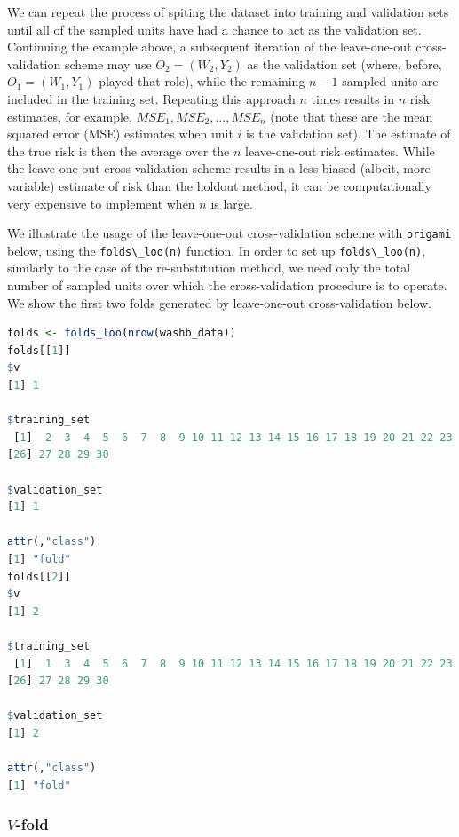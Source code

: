 \documentclass[
  12pt, krantz2,
]{krantz}
\newcommand{\passthrough}[1]{#1}
\newcommand{\1}{\mathbbm{1}}
\theoremstyle{definition}
\theoremstyle{definition}
\theoremstyle{definition}
\theoremstyle{definition}
\theoremstyle{remark}
\begin{document}
We can repeat the process of spiting the dataset into training and validation
sets until all of the sampled units have had a chance to act as the validation
set. Continuing the example above, a subsequent iteration of the leave-one-out
cross-validation scheme may use \(O_2 = (W_2, Y_2)\) as the validation set (where,
before, \(O_1 = (W_1, Y_1)\) played that role), while the remaining \(n-1\) sampled
units are included in the training set. Repeating this approach \(n\) times
results in \(n\) risk estimates, for example, \(MSE_1, MSE_2, \ldots, MSE_n\) (note
that these are the mean squared error (MSE) estimates when unit \(i\) is the
validation set). The estimate of the true risk is then the average over the \(n\)
leave-one-out risk estimates. While the leave-one-out cross-validation scheme
results in a less biased (albeit, more variable) estimate of risk than the
holdout method, it can be computationally very expensive to implement when \(n\)
is large.

We illustrate the usage of the leave-one-out cross-validation scheme with
\passthrough{\lstinline!origami!} below, using the \passthrough{\lstinline!folds\_loo(n)!} function. In order to set up
\passthrough{\lstinline!folds\_loo(n)!}, similarly to the case of the re-substitution method, we need
only the total number of sampled units over which the cross-validation procedure
is to operate. We show the first two folds generated by leave-one-out
cross-validation below.

\begin{lstlisting}[language=R]
folds <- folds_loo(nrow(washb_data))
folds[[1]]
$v
[1] 1

$training_set
 [1]  2  3  4  5  6  7  8  9 10 11 12 13 14 15 16 17 18 19 20 21 22 23 24 25 26
[26] 27 28 29 30

$validation_set
[1] 1

attr(,"class")
[1] "fold"
folds[[2]]
$v
[1] 2

$training_set
 [1]  1  3  4  5  6  7  8  9 10 11 12 13 14 15 16 17 18 19 20 21 22 23 24 25 26
[26] 27 28 29 30

$validation_set
[1] 2

attr(,"class")
[1] "fold"
\end{lstlisting}

\hypertarget{v-fold}{%
\subsubsection{\texorpdfstring{\(V\)-fold}{V-fold}}\label{v-fold}}
\end{document}
